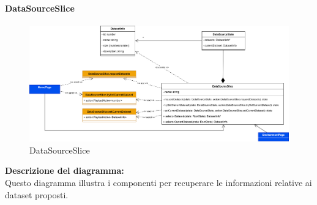 \paragraph{DataSourceSlice}
\begin{figure}[h!] \centering
    \includegraphics[scale=0.18]{template/images/uml_front/logic/DataSourceSlice.png}
    \caption{DataSourceSlice}
\end{figure}
\textbf{Descrizione del diagramma:}\\
Questo diagramma illustra i componenti per recuperare le informazioni relative ai dataset proposti.
